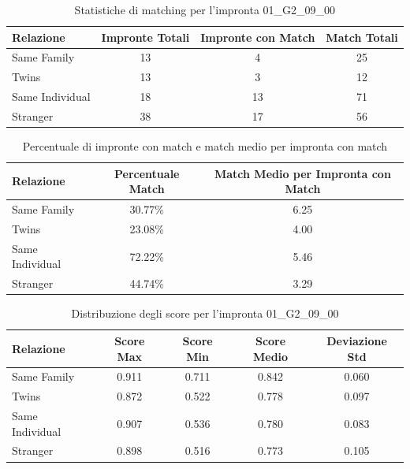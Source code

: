 \begin{table}[htbp]
\centering
\caption{Statistiche di matching per l'impronta 01\_G2\_09\_00}
\label{tab:results_01_G2_09_00}
\begin{tabular}{|l|c|c|c|}
\hline
\textbf{Relazione} & \textbf{Impronte Totali} & \textbf{Impronte con Match} & \textbf{Match Totali} \\
\hline
Same Family & 13 & 4 & 25 \\
\hline
Twins & 13 & 3 & 12 \\
\hline
Same Individual & 18 & 13 & 71 \\
\hline
Stranger & 38 & 17 & 56 \\
\hline
\end{tabular}
\end{table}


\begin{table}[htbp]
\centering
\caption{Percentuale di impronte con match e match medio per impronta con match}
\label{tab:match_percentage_01_G2_09_00}
\begin{tabular}{|l|c|c|}
\hline
\textbf{Relazione} & \textbf{Percentuale Match} & \textbf{Match Medio per Impronta con Match} \\
\hline
Same Family & 30.77\% & 6.25 \\
\hline
Twins & 23.08\% & 4.00 \\
\hline
Same Individual & 72.22\% & 5.46 \\
\hline
Stranger & 44.74\% & 3.29 \\
\hline
\end{tabular}
\end{table}


\begin{table}[htbp]
\centering
\caption{Distribuzione degli score per l'impronta 01\_G2\_09\_00}
\label{tab:scores_01_G2_09_00}
\begin{tabular}{|l|c|c|c|c|}
\hline
\textbf{Relazione} & \textbf{Score Max} & \textbf{Score Min} & \textbf{Score Medio} & \textbf{Deviazione Std} \\
\hline
Same Family & 0.911 & 0.711 & 0.842 & 0.060 \\
\hline
Twins & 0.872 & 0.522 & 0.778 & 0.097 \\
\hline
Same Individual & 0.907 & 0.536 & 0.780 & 0.083 \\
\hline
Stranger & 0.898 & 0.516 & 0.773 & 0.105 \\
\hline
\end{tabular}
\end{table}

